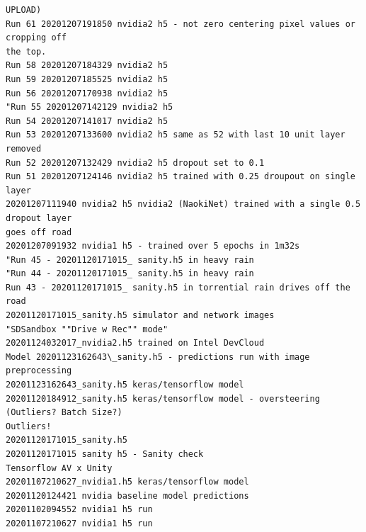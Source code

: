 \begin{verbatim}
UPLOAD)
Run 61 20201207191850 nvidia2 h5 - not zero centering pixel values or cropping off
the top.
Run 58 20201207184329 nvidia2 h5
Run 59 20201207185525 nvidia2 h5
Run 56 20201207170938 nvidia2 h5
"Run 55 20201207142129 nvidia2 h5
Run 54 20201207141017 nvidia2 h5
Run 53 20201207133600 nvidia2 h5 same as 52 with last 10 unit layer removed
Run 52 20201207132429 nvidia2 h5 dropout set to 0.1
Run 51 20201207124146 nvidia2 h5 trained with 0.25 droupout on single layer
20201207111940 nvidia2 h5 nvidia2 (NaokiNet) trained with a single 0.5 dropout layer
goes off road
20201207091932 nvidia1 h5 - trained over 5 epochs in 1m32s
"Run 45 - 20201120171015_ sanity.h5 in heavy rain
"Run 44 - 20201120171015_ sanity.h5 in heavy rain
Run 43 - 20201120171015_ sanity.h5 in torrential rain drives off the road
20201120171015_sanity.h5 simulator and network images
"SDSandbox ""Drive w Rec"" mode"
20201124032017_nvidia2.h5 trained on Intel DevCloud
Model 20201123162643\_sanity.h5 - predictions run with image preprocessing
20201123162643_sanity.h5 keras/tensorflow model
20201120184912_sanity.h5 keras/tensorflow model - oversteering (Outliers? Batch Size?)
Outliers!
20201120171015_sanity.h5
20201120171015 sanity h5 - Sanity check
Tensorflow AV x Unity
20201107210627_nvidia1.h5 keras/tensorflow model
20201120124421 nvidia baseline model predictions
20201102094552 nvidia1 h5 run
20201107210627 nvidia1 h5 run
\end{verbatim}

